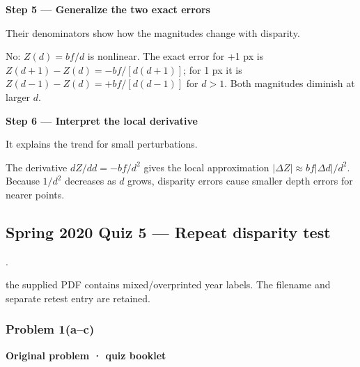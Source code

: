 \documentclass[letterpaper,11pt,english,openany,oneside]{jupyterBook}
\begin{document}
\par

\par\medskip{}
{\color{QuizStepRed}\bfseries Step 5 — Generalize the two exact errors}\par\smallskip

\sphinxAtStartPar
{} Their denominators show how the magnitudes change with disparity.

\sphinxAtStartPar
No: {\color{QuizMathBlue} \(Z(d)=bf/d\)} is nonlinear. The exact error for +1 px is {\color{QuizMathBlue} \(Z(d+1)-Z(d)=-bf/[d(d+1)]\)}; for \sphinxhyphen{}1 px it is {\color{QuizMathBlue} \(Z(d-1)-Z(d)=+bf/[d(d-1)]\)} for {\color{QuizMathBlue} \(d>1\)}. Both magnitudes diminish at larger {\color{QuizMathBlue} \(d\)}.

\par

\par\medskip{}
{\color{QuizStepRed}\bfseries Step 6 — Interpret the local derivative}\par\smallskip

\sphinxAtStartPar
{} It explains the trend for small perturbations.

\sphinxAtStartPar
The derivative {\color{QuizMathBlue} \(dZ/dd=-bf/d^2\)} gives the local approximation {\color{QuizMathBlue} \(|\Delta Z|\approx bf|\Delta d|/d^2\)}. Because {\color{QuizMathBlue} \(1/d^2\)} decreases as {\color{QuizMathBlue} \(d\)} grows, disparity errors cause smaller depth errors for nearer points.

\par


\subsection{Spring 2020 Quiz 5 — Repeat disparity test}
\label{\detokenize{lectures/lecture04/quiz-workbook:spring-2020-quiz-5-repeat-disparity-test}}\label{\detokenize{lectures/lecture04/quiz-workbook:quiz-source-6}}
\sphinxAtStartPar
{} .

\sphinxAtStartPar
{} the supplied PDF contains mixed/overprinted year labels. The filename and separate retest entry are retained.


\subsubsection{Problem 1(a–c)}
\label{\detokenize{lectures/lecture04/quiz-workbook:quiz-6-q1}}\label{\detokenize{lectures/lecture04/quiz-workbook:id5}}
\par\medskip\textbf{Original problem · quiz booklet}\par\smallskip
\end{document}

